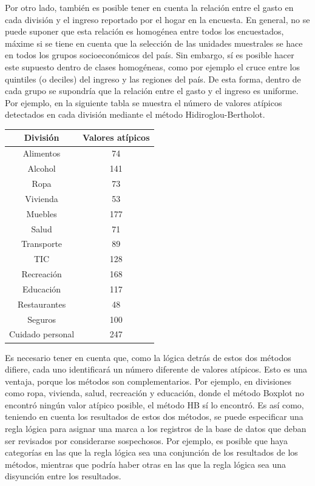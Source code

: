 \documentclass[
  12pt,
]{book}
\begin{document}
Por otro lado, también es posible tener en cuenta la relación entre el gasto en cada división y el ingreso reportado por el hogar en la encuesta. En general, no se puede suponer que esta relación es homogénea entre todos los encuestados, máxime si se tiene en cuenta que la selección de las unidades muestrales se hace en todos los grupos socioeconómicos del país. Sin embargo, sí es posible hacer este supuesto dentro de clases homogéneas, como por ejemplo el cruce entre los quintiles (o deciles) del ingreso y las regiones del país. De esta forma, dentro de cada grupo se supondría que la relación entre el gasto y el ingreso es uniforme. Por ejemplo, en la siguiente tabla se muestra el número de valores atípicos detectados en cada división mediante el método Hidiroglou-Bertholot.

\begin{longtable}[]{@{}cc@{}}
\toprule()
División & Valores atípicos \\
\midrule()
\endhead
Alimentos & 74 \\
Alcohol & 141 \\
Ropa & 73 \\
Vivienda & 53 \\
Muebles & 177 \\
Salud & 71 \\
Transporte & 89 \\
TIC & 128 \\
Recreación & 168 \\
Educación & 117 \\
Restaurantes & 48 \\
Seguros & 100 \\
Cuidado personal & 247 \\
\bottomrule()
\end{longtable}

Es necesario tener en cuenta que, como la lógica detrás de estos dos métodos difiere, cada uno identificará un número diferente de valores atípicos. Esto es una ventaja, porque los métodos son complementarios. Por ejemplo, en divisiones como ropa, vivienda, salud, recreación y educación, donde el método Boxplot no encontró ningún valor atípico posible, el método HB sí lo encontró. Es así como, teniendo en cuenta los resultados de estos dos métodos, se puede especificar una regla lógica para asignar una marca a los registros de la base de datos que deban ser revisados por considerarse sospechosos. Por ejemplo, es posible que haya categorías en las que la regla lógica sea una conjunción de los resultados de los métodos, mientras que podría haber otras en las que la regla lógica sea una disyunción entre los resultados.
\end{document}
